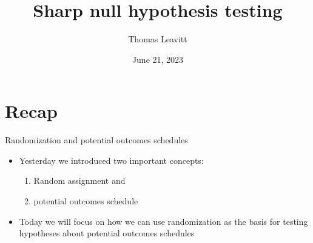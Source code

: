 \documentclass[table, xcolor = {dvipsnames}, 9pt]{beamer}
\title[]{Sharp null hypothesis testing} %
\author{Thomas Leavitt} %
\institute[] %
{
\medskip
\textit{} %
}
\date{June 21, 2023} %
\theoremstyle{plain}
\begin{document}
\begin{frame}
\titlepage %
\end{frame}


\section{Recap}
\begin{frame}{Randomization and potential outcomes schedules}
\vfill
\begin{itemize}
\item Yesterday we introduced two important concepts: \vfill
\begin{enumerate}
\item Random assignment and \vfill
\item potential outcomes schedule \vfill
\end{enumerate}
\item Today we will focus on how we can use randomization as the basis for testing hypotheses about potential outcomes schedules
\end{itemize} \vfill
\end{frame}
\end{document}

